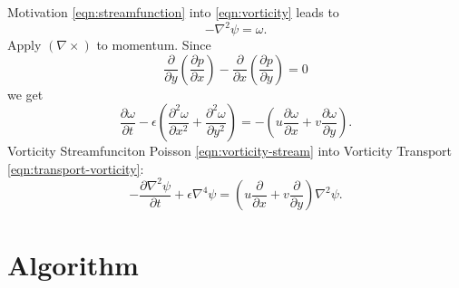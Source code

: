 \documentclass{beamer}
\begin{document}
  \begin{frame}{Motivation}
  \eqref{eqn:streamfunction} into \eqref{eqn:vorticity} leads to
	\begin{equation}
			\label{eqn:vorticity-stream}
			-\nabla ^2 \psi = \omega.
		\end{equation}
  Apply $(\nabla \times)$ to momentum. Since
	\begin{equation}
	\frac{\partial}{\partial y}\left(\frac{\partial p}{\partial x}\right) - 
	\frac{\partial}{\partial x}\left(\frac{\partial p}{\partial y}\right)=0
	\end{equation}
	we get
  \begin{equation}
			\label{eqn:transport-vorticity}
				\frac{\partial\omega}{\partial t} -\epsilon \left(\frac{\partial ^2 \omega}{\partial x^2} 
				+ \frac{\partial^2 \omega}{\partial y^2} \right)
				=-\left( u \frac{\partial\omega}{\partial x} 
				+ v\frac{\partial\omega}{\partial y}\right).
			\end{equation}
	Vorticity Streamfunciton Poisson \eqref{eqn:vorticity-stream} into Vorticity Transport \eqref{eqn:transport-vorticity}:
	\begin{equation}
	\label{eqn:biharmonic-streamfunction}
		\boxed{
		-\frac{\partial\nabla ^2 \psi}{\partial t} 
		+\epsilon\nabla ^4 \psi=\left( u \frac{\partial}{\partial x} 
				+ v\frac{\partial}{\partial y}\right)\nabla^2\psi.
		}
	\end{equation}
	\end{frame}


  \section{Algorithm}
\end{document}
